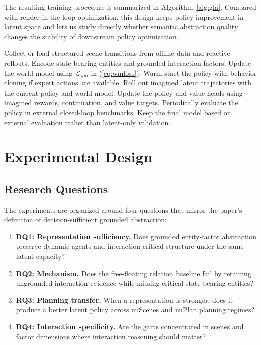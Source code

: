 \documentclass[journal]{IEEEtran}
\newcommand{\method}{\textsc{GFA}}
\begin{document}
The resulting training procedure is summarized in Algorithm~\ref{alg:gfa}. Compared with render-in-the-loop optimization, this design keeps policy improvement in latent space and lets us study directly whether semantic abstraction quality changes the stability of downstream policy optimization.

\begin{algorithm}[!t]
\caption{\method\ Policy-Learning Procedure}
\label{alg:gfa}
\begin{algorithmic}[1]
\STATE Collect or load structured scene transitions from offline data and reactive rollouts.
\STATE Encode state-bearing entities and grounded interaction factors.
\STATE Update the world model using $\mathcal{L}_{\mathrm{wm}}$ in (\ref{eq:wmloss}).
\STATE Warm start the policy with behavior cloning if expert actions are available.
\STATE Roll out imagined latent trajectories with the current policy and world model.
\STATE Update the policy and value heads using imagined rewards, continuation, and value targets.
\STATE Periodically evaluate the policy in external closed-loop benchmarks.
\STATE Keep the final model based on external evaluation rather than latent-only validation.
\end{algorithmic}
\end{algorithm}

\section{Experimental Design}
\subsection{Research Questions}
The experiments are organized around four questions that mirror the paper's definition of decision-sufficient grounded abstraction:
\begin{enumerate}
\item \textbf{RQ1: Representation sufficiency.} Does grounded entity-factor abstraction preserve dynamic agents and interaction-critical structure under the same latent capacity?
\item \textbf{RQ2: Mechanism.} Does the free-floating relation baseline fail by retaining ungrounded interaction evidence while missing critical state-bearing entities?
\item \textbf{RQ3: Planning transfer.} When a representation is stronger, does it produce a better latent policy across nuScenes and nuPlan planning regimes?
\item \textbf{RQ4: Interaction specificity.} Are the gains concentrated in scenes and factor dimensions where interaction reasoning should matter?
\end{enumerate}
\end{document}
